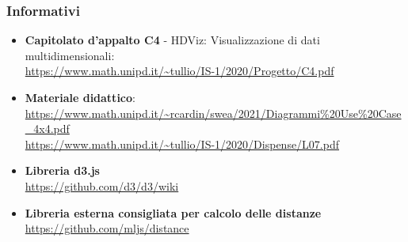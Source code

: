     \subsubsection{Informativi}
    \begin{itemize}
        \item \textbf{Capitolato d'appalto C4} - HDViz: Visualizzazione di dati multidimensionali:\\\url{https://www.math.unipd.it/~tullio/IS-1/2020/Progetto/C4.pdf}
        \item \textbf{Materiale didattico}: \\\url{https://www.math.unipd.it/~rcardin/swea/2021/Diagrammi%20Use%20Case_4x4.pdf}
        \\\url{https://www.math.unipd.it/~tullio/IS-1/2020/Dispense/L07.pdf}
        \item \textbf{Libreria d3.js}
        \\\url{https://github.com/d3/d3/wiki}
        \item \textbf{Libreria esterna consigliata per calcolo delle distanze}
        \\\url{https://github.com/mljs/distance}
    \end{itemize}